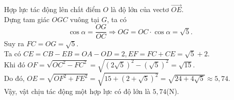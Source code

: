 \begin{ex}
{					Hợp lực tác động lên chất điểm $O$ là độ lớn của vectơ $\overrightarrow{OE}$.\\
					Dựng tam giác $O G C$ vuông tại $G$, ta có
					\[\cos \alpha=\dfrac{O G}{O C} \Rightarrow O G=O C \cdot \cos \alpha=\sqrt{5}.\]
					Suy ra $F C=O G=\sqrt{5}$.\\
					Ta có $C E=C B-E B=O A-O D=2, E F=F C+C E=\sqrt{5}+2$.\\
					Khi đó $O F=\sqrt{O C^2-F C^2}=\sqrt{(2 \sqrt{5})^2-(\sqrt{5})^2}=\sqrt{15}$.\\
					Do đó, $O E=\sqrt{O F^2+F E^2}=\sqrt{15+(2+\sqrt{5})^2}=\sqrt{24+4 \sqrt{5}} \approx 5{,}74$.\\
					Vậy, vật chịu tác động một hợp lực có độ lớn là $5{,}74$(N).
					}
					\end{ex}


